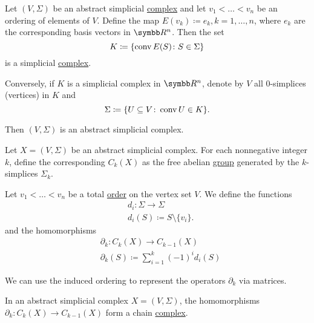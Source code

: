 \begin{proposition}\label{thm:abstract_simplicial_complex_iff_simplicial_complex}
  Let \( (V, \Sigma) \) be an abstract simplicial \hyperref[def:abstract_simplicial_complex]{complex} and let \( v_1 < \ldots < v_n \) be an ordering of elements of \( V \). Define the map \( E(v_k) \coloneqq e_k, k = 1, \ldots, n \), where \( e_k \) are the corresponding basis vectors in \( \BB{R^n} \). Then the set
  \begin{equation*}
    K \coloneqq \{ \operatorname{conv} E(S) \colon S \in \Sigma \}
  \end{equation*}
  is a simplicial \hyperref[def:simplicial_complex]{complex}.

  Conversely, if \( K \) is a simplicial complex in \( \BB{R^n} \), denote by \( V \) all \( 0 \)-simplices (vertices) in \( K \) and
  \begin{equation*}
    \Sigma \coloneqq \{ U \subseteq V \colon \operatorname{conv} U \in K \}.
  \end{equation*}

  Then \( (V, \Sigma) \) is an abstract simplicial complex.
\end{proposition}

\begin{definition}\label{def:group_of_chains}\cite[262]{Carlsson2009}
  Let \( X = (V, \Sigma) \) be an abstract simplicial complex. For each nonnegative integer \( k \), define the corresponding  \( C_k(X) \) as the free abelian \hyperref[def:free_abelian_group]{group} generated by the \( k \)-simplices \( \Sigma_k \).

  Let \( v_1 < \ldots < v_n \) be a total \hyperref[def:poset]{order} on the vertex set \( V \). We define the functions
  \begin{align*}
    &d_i: \Sigma \to \Sigma \\
    &d_i(S) \coloneqq S \setminus \{ v_i \}.
  \end{align*}
  and the homomorphisms
  \begin{align*}
    &\partial_k: C_k(X) \to C_{k-1}(X) \\
    &\partial_k(S) \coloneqq \sum_{i=1}^k (-1)^i d_i(S)
  \end{align*}

  We can use the induced ordering to represent the operators \( \partial_k \) via matrices.
\end{definition}

\begin{proposition}\label{def:abstract_simplicial_chain_complex}
  In an abstract simplicial complex \( X = (V, \Sigma) \), the homomorphisms \( \partial_k: C_k(X) \to C_{k-1}(X) \) form a chain \hyperref[def:chain_complex]{complex}.
\end{proposition}
